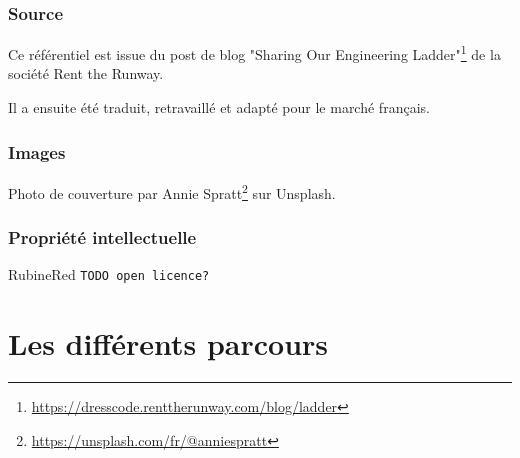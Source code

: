 \documentclass[a4paper, french, openany, 12pt]{book}
\newcommand{\fullwidthimage}[1]{
  \begin{center}
    \makebox[\textwidth]{\texttt{[image: \#1]}}
  \end{center}
}
\newcommand{\todo}[1]{
  \begin{color}{RubineRed}
    \texttt{TODO {#1}}
  \end{color}
}
\begin{document}
\begin{multicols}{2}
  \section*{Source}
  
  Ce référentiel est issue du post de blog 
  "Sharing Our Engineering Ladder"\footnote{\url{https://dresscode.renttherunway.com/blog/ladder}}
  de la société Rent the Runway.
  
  Il a ensuite été traduit, retravaillé et adapté pour le marché français.
  
  \section*{Images}
  
  Photo de couverture par Annie Spratt\footnote{\url{https://unsplash.com/fr/@anniespratt}} sur Unsplash.
  
  \section*{Propriété intellectuelle}
  
  \todo{open licence?}
  
\end{multicols}
  
\mainmatter

\part{Les différents parcours}

\fullwidthimage{images/tracks.png}
\end{document}
